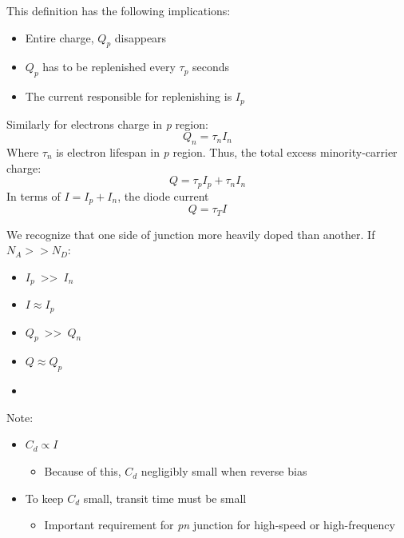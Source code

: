 \documentclass{report}
\begin{document}
This definition has the following implications:
\begin{itemize}
	\item Entire charge, $Q_p$ disappears
	\item $Q_p$ has to be replenished every $\tau_p$ seconds
	\item The current responsible for replenishing is $I_p$
\end{itemize}

Similarly for electrons charge in \textit{p} region:
\begin{equation}
	Q_n = \tau_n I_n \label{eq:3.6-qntnin}
\end{equation}
Where $\tau_n$ is electron lifespan in \textit{p} region. Thus, the total excess minority-carrier charge:
\begin{equation}
	Q = \tau_p I_p + \tau_n I_n
	\label{eq:3.6-qtpiptnin}
\end{equation}
In terms of $I = I_p + I_n$, the diode current
\begin{equation}
	Q = \tau_T I
\end{equation}

We recognize that one side of junction more heavily doped than another. If $N_A >> N_D$:
\begin{itemize}
	\item $I_p$~\textgreater{}\textgreater~$I_n$
	\item $I \approx I_p$
	\item $Q_p$~\textgreater{}\textgreater~$Q_n$
	\item $Q \approx Q_p$
	\item {}
\end{itemize}

Note:
\begin{itemize}
	\item $C_d \propto I$
		\begin{itemize}
			\item Because of this, $C_d$ negligibly small when reverse bias
		\end{itemize}
	\item To keep $C_d$ small, transit time must be small
		\begin{itemize}
			\item Important requirement for \textit{pn} junction for high-speed or high-frequency
		\end{itemize}
\end{itemize}


\end{document}

